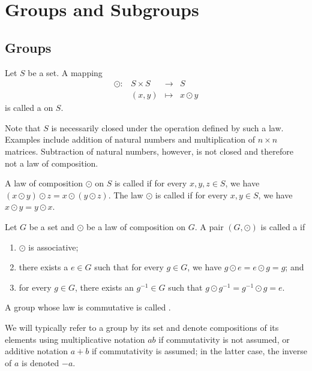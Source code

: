\chapter{Groups and Subgroups}

\section{Groups}

\begin{defn}
Let $ S $ be a set. A mapping
\begin{equation*}
    \begin{array}{rccc}
        \odot: & S\times S & \to & S \\
        & (x,y) & \mapsto & x\odot y
    \end{array}
\end{equation*}
is called a  on $ S $.
\end{defn}

Note that $ S $ is necessarily closed under the operation defined by such a law. Examples include addition of natural numbers and multiplication of $ n\times n $ matrices. Subtraction of natural numbers, however, is not closed and therefore not a law of composition.

\begin{defn}
A law of composition $ \odot $ on $ S $ is called  if for every $ x,y,z\in S $, we have $ (x\odot y)\odot z=x\odot(y\odot z) $. The law $ \odot $ is called  if for every $ x,y\in S $, we have $ x\odot y=y\odot x $.
\end{defn}

\begin{defn}
Let $ G $ be a set and $ \odot $ be a law of composition on $ G $. A pair $ (G,\odot) $ is called a  if
\begin{enumerate}
    \item $ \odot $ is associative;
    \item there exists a  $ e\in G $ such that for every $ g\in G $, we have $ g\odot e=e\odot g=g $; and
    \item for every $ g\in G $, there exists an  $ g^{-1}\in G $ such that $ g\odot g^{-1}=g^{-1}\odot g=e $.
\end{enumerate}
A group whose law is commutative is called .
\end{defn}

We will typically refer to a group by its set and denote compositions of its elements using multiplicative notation $ ab $ if commutativity is not assumed, or additive notation $ a+b $ if commutativity is assumed; in the latter case, the inverse of $ a $ is denoted $ -a $.

